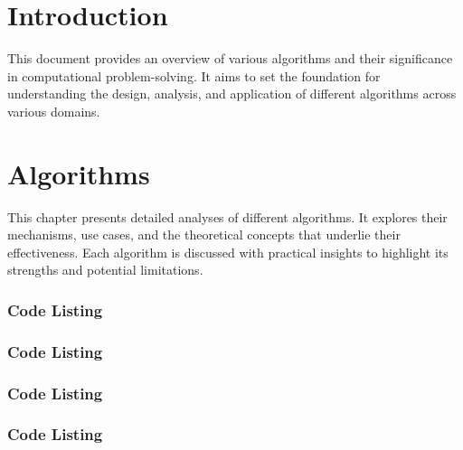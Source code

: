\documentclass{report}%
\begin{document}
%
\normalsize%
%
\tableofcontents%
\chapter{Introduction}%
\label{chap:Introduction}%
This document provides an overview of various algorithms and their significance in computational problem{-}solving. It aims to set the foundation for understanding the design, analysis, and application of different algorithms across various domains.

%
\chapter{Algorithms}%
\label{chap:Algorithms}%
This chapter presents detailed analyses of different algorithms. It explores their mechanisms, use cases, and the theoretical concepts that underlie their effectiveness. Each algorithm is discussed with practical insights to highlight its strengths and potential limitations.

%
%
\subsection{Code Listing}%
\label{subsec:CodeListing}%


%
%
\subsection{Code Listing}%
\label{subsec:CodeListing}%


%
%
\subsection{Code Listing}%
\label{subsec:CodeListing}%


%
%
\subsection{Code Listing}%
\label{subsec:CodeListing}%


%
\end{document}
